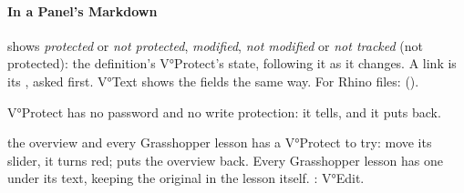 \paragraph{In a Panel's Markdown}  shows \emph{protected} or \emph{not protected},
 \emph{modified}, \emph{not modified} or \emph{not tracked} (not protected): the definition's
V°Protect's state, following it as it changes. A link  is its , asked first.
V°Text shows the fields the same way. For Rhino files:  ().

\begin{note}
V°Protect has no password and no write protection: it tells, and it puts back.
\end{note}

\begin{lesson}{the overview and every Grasshopper lesson}
 has a V°Protect to try: move its slider, it turns red;  puts the overview back. Every
Grasshopper lesson has one under its text, keeping the original in the lesson itself. : V°Edit.
\end{lesson}
